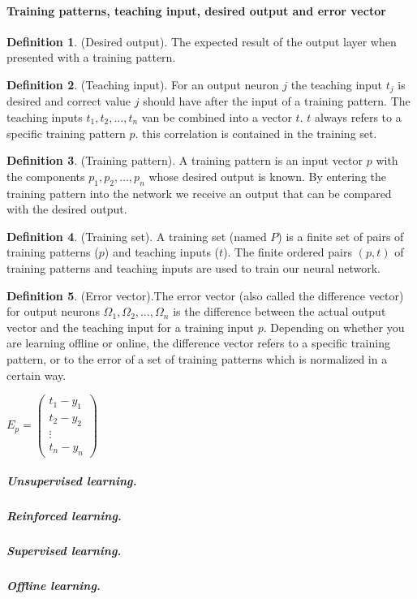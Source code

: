 \documentclass[pdftex,a4paper,12pt,twoside]{report}
\theoremstyle{plain} \newtheorem{theorem}{Theorem} \newtheorem{proposition}{Proposition} \newtheorem{lemma}{Lemma} \newtheorem*{corollary}{Corollary}
\theoremstyle{definition} \newtheorem{definition}{Definition} \newtheorem{conjecture}{Conjecture} \newtheorem*{example}{Example} \newtheorem{algorithm}{Algorithm}
\theoremstyle{remark} \newtheorem*{remark}{Remark} \newtheorem*{note}{Note} \newtheorem{case}{Case}
\begin{document}
\paragraph{Training patterns, teaching input, desired output and error vector}
\begin{definition}
(Desired output). The expected result of the output layer when presented with a training pattern.
\end{definition}
\begin{definition}
(Teaching input). For an output neuron $j$ the teaching input $t_j$ is desired and correct value $j$ should have after the input of a training pattern. The teaching inputs $t_1,t_2, \dotsc ,t_n$ van be combined into a vector $t$. $t$ always refers to a specific training pattern $p$. this correlation is contained in the training set.
\end{definition}
\begin{definition}
(Training pattern). A training pattern is an input vector $p$ with the components $p_1,p_2, \dotsc , p_n$ whose desired output is known. By entering the training pattern into the network we receive an output that can be compared with the desired output. 
\end{definition}
\begin{definition}
(Training set). A training set (named $P$) is a finite set of pairs of training patterns ($p$) and teaching inputs ($t$). The finite ordered pairs $(p,t)$ of training patterns and teaching inputs are used to train our neural network.
\end{definition}
\begin{definition}
(Error vector).The error vector (also called the difference vector) for output neurons $\Omega_1,\Omega_2, \dotsc ,\Omega_n$ is the difference between the actual output vector and the teaching input for a training input $p$. Depending on whether you are learning offline or online, the difference vector refers to a specific training pattern, or to the error of a set of training patterns which is normalized in a certain way.\begin{center}
$E_p = 	\begin{pmatrix}
			t_1-y_1\\
			t_2-y_2\\
			\vdots\\
			t_n-y_n
		\end{pmatrix}$
\end{center}
\end{definition}
\subparagraph{Unsupervised learning.}
\subparagraph{Reinforced learning.}
\subparagraph{Supervised learning.}
\subparagraph{Offline learning.}
\end{document}
